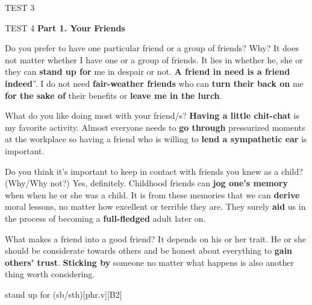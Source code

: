 \begin{glossarymc}[Cambridge 6]
\begin{test}{TEST 3}
    \end{test}

    \begin{test}{TEST 4}
    \noindent
    \textbf{Part 1. Your Friends}
    \begin{qa}{Do you prefer to have one particular friend or a group of friends? Why?}
    It does not matter whether I have one or a group of friends. It lies in whether he, she or they can \textbf{stand up for} me in despair or not. \`\`\textbf{A friend in need is a friend indeed}''. I do not need \textbf{fair-weather friends} who can \textbf{turn their back on} me \textbf{for the sake of} their benefits or \textbf{leave me in the lurch}.
    \end{qa}

    \begin{qa}{What do you like doing most with your friend/s?}
    \textbf{Having a little chit-chat} is my favorite activity. Almost everyone needs to \textbf{go through} pressurized moments at the workplace so having a friend who is willing to \textbf{lend a sympathetic ear} is important.
    \end{qa}

    \begin{qa}{Do you think it's important to keep in contact with friends you knew as a child? (Why/Why not?)}
    Yes, definitely. Childhood friends can \textbf{jog one's memory} when when he or she was a child. It is from these memories that we can \textbf{derive} moral lessons, no matter how excellent or terrible they are. They surely \textbf{aid} us in the process of becoming a \textbf{full-fledged} adult later on.
    \end{qa}

    \begin{qa}{What makes a friend into a good friend?}
    It depends on his or her trait. He or she should be considerate towards others and be honest about everything to \textbf{gain others' trust}. \textbf{Sticking by} someone no matter what happens is also another thing worth considering.
    \end{qa}

        \begin{VocabExplain}[Part 1]
            \begin{ExplainCard}{stand up for (sb/sth)}[phr.v][B2]
            \end{ExplainCard}


\end{VocabExplain}
\end{test}
\end{glossarymc}

